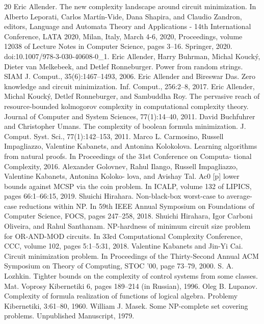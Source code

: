\begin{thebibliography}{20}
Eric Allender. The new complexity landscape around circuit minimization. In Alberto Leporati, Carlos Martín-Vide, Dana Shapira, and Claudio Zandron, editors, Language and Automata Theory and Applications - 14th International Conference, LATA 2020, Milan, Italy, March 4-6, 2020, Proceedings, volume 12038 of Lecture Notes in Computer Science, pages 3–16. Springer, 2020. doi:10.1007/978-3-030-40608-0\_1.
Eric Allender, Harry Buhrman, Michal Koucký, Dieter van Melkebeek, and Detlef Ronneburger. Power from random strings. SIAM J. Comput., 35(6):1467–1493, 2006.
Eric Allender and Bireswar Das. Zero knowledge and circuit minimization. Inf. Comput., 256:2–8, 2017.
Eric Allender, Michal Koucký, Detlef Ronneburger, and Sambuddha Roy. The pervasive reach of resource-bounded kolmogorov complexity in computational complexity theory. Journal of Computer and System Sciences, 77(1):14–40, 2011.
David Buchfuhrer and Christopher Umans. The complexity of boolean formula minimization. J. Comput. Syst. Sci., 77(1):142–153, 2011.
Marco L. Carmosino, Russell Impagliazzo, Valentine Kabanets, and Antonina Kolokolova. Learning algorithms from natural proofs. In Proceedings of the 31st Conference on Computa- tional Complexity, 2016.
Alexander Golovnev, Rahul Ilango, Russell Impagliazzo, Valentine Kabanets, Antonina Koloko- lova, and Avishay Tal. Ac0 [p] lower bounds against MCSP via the coin problem. In ICALP, volume 132 of LIPICS, pages 66:1–66:15, 2019.
Shuichi Hirahara. Non-black-box worst-case to average-case reductions within NP. In 59th IEEE Annual Symposium on Foundations of Computer Science, FOCS, pages 247–258, 2018.
Shuichi Hirahara, Igor Carboni Oliveira, and Rahul Santhanam. NP-hardness of minimum circuit size problem for OR-AND-MOD circuits. In 33rd Computational Complexity Conference, CCC, volume 102, pages 5:1–5:31, 2018.
Valentine Kabanets and Jin-Yi Cai. Circuit minimization problem. In Proceedings of the Thirty-Second Annual ACM Symposium on Theory of Computing, STOC ’00, page 73–79, 2000.
S. A. Lozhkin. Tighter bounds on the complexity of control systems from some classes. Mat. Voprosy Kibernetiki 6, pages 189–214 (in Russian), 1996.
Oleg B. Lupanov. Complexity of formula realization of functions of logical algebra. Problemy Kibernetiki, 3:61–80, 1960.
William J. Masek. Some NP-complete set covering problems. Unpublished Manuscript, 1979.

\end{thebibliography}
